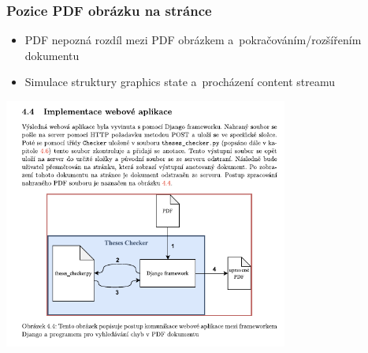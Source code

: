\begin{frame}\frametitle{Pozice PDF obrázku na stránce}

  \begin{itemize}
    \item PDF nepozná rozdíl mezi PDF obrázkem a~pokračováním/rozšířením dokumentu 
    \item Simulace struktury graphics state a~procházení content streamu
  \end{itemize}
  \centering
  \includegraphics[width=0.7\textwidth]{img/pdf_picture.pdf}
\end{frame}




